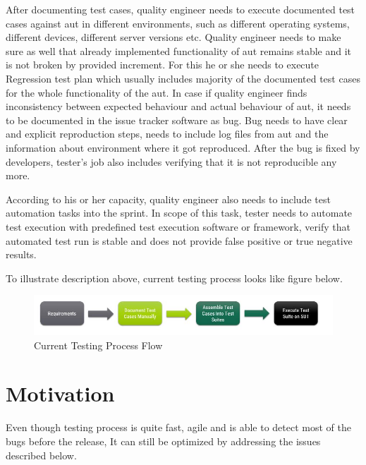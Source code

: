 \par
After documenting test cases, quality engineer needs to execute documented test cases against \acrlong{aut} in different environments, such as different operating systems, different devices, different server versions etc. Quality engineer needs to make sure as well that already implemented functionality of \acrlong{aut} remains stable and it is not broken by provided increment. For this he or she needs to execute Regression test plan which usually includes majority of the documented test cases for the whole functionality of the \acrlong{aut}. In case if quality engineer finds inconsistency between expected behaviour and actual behaviour of \acrlong{aut}, it needs to be documented in the issue tracker software as bug. Bug needs to have clear and explicit reproduction steps, needs to include log files from \acrlong{aut} and the information about environment where it got reproduced. After the bug is fixed by developers, tester's job also includes verifying that it is not reproducible any more.

\par
According to his or her capacity, quality engineer also needs to include test automation tasks into the sprint. In scope of this task, tester needs to automate test execution with predefined test execution software or framework, verify that automated test run is stable and does not provide false positive or true negative results.

\par
To illustrate description above, current testing process looks like figure below.

\begin{figure} [htbp!]
	\centering
					\includegraphics[width=1.1\textwidth]{figures/current_testing_process_flow.JPG}
					\caption{\label{Fig:current_testing_process_flow} Current Testing Process Flow}
\end{figure}

\section{Motivation}

\par
Even though testing process is quite fast, agile and is able to detect most of the bugs before the release, It can still be optimized by addressing the issues described below.


